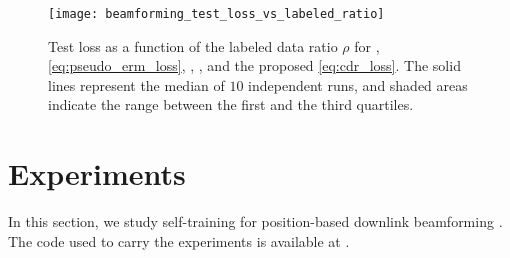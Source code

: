\documentclass[journal]{IEEEtran}
\begin{document}
\begin{figure}
    \centering
    \texttt{[image: beamforming\_test\_loss\_vs\_labeled\_ratio]}
    \vspace{-0.09in}
    \caption{
    Test loss as a function of the labeled data ratio $\rho$ for ,  \eqref{eq:pseudo_erm_loss},  \cite{zhu2024doubly}, , and the proposed  \eqref{eq:cdr_loss}.
    The solid lines represent the median of $10$ independent runs, and shaded areas indicate the range between the first and the third quartiles.
    }
    \label{fig:test_loss_vs_labeled_ratio}
    \vspace{-0.08in}
\end{figure}

\section{Experiments} \label{sec:experiments}

In this section, we study self-training for position-based downlink beamforming \cite{zeng2021toward, wu2021environment}.
The code used to carry the experiments is available at \cite{repoRuah2025CDR}.
\end{document}
